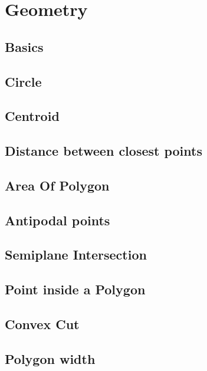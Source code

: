 \section{Geometry}
\subsection{Basics}
\raggedbottom
\hrulefill
\subsection{Circle}
\raggedbottom
\hrulefill
\subsection{Centroid}
\raggedbottom
\hrulefill
\subsection{Distance between closest points}
\raggedbottom
\hrulefill
\subsection{Area Of Polygon}
\raggedbottom
\hrulefill
\subsection{Antipodal points}
\raggedbottom
\hrulefill
\subsection{Semiplane Intersection}
\raggedbottom
\hrulefill
\subsection{Point inside a Polygon}
\raggedbottom
\hrulefill
\subsection{Convex Cut}
\raggedbottom
\hrulefill
\subsection{Polygon width}
\raggedbottom
\hrulefill
